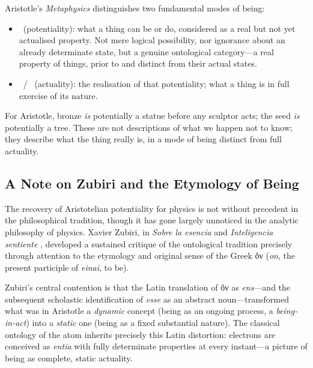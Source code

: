Aristotle's \textit{Metaphysics} \cite{aristotle_1924_metaphysics} distinguishes two fundamental modes of being:

\begin{itemize}
  \item \dunamis\ (potentiality): what a thing can be or do, considered as a real but not yet actualised property. Not mere logical possibility, nor ignorance about an already determinate state, but a genuine ontological category---a real property of things, prior to and distinct from their actual states.
  \item \energeia\ / \entelechia\ (actuality): the realisation of that potentiality; what a thing is in full exercise of its nature.
\end{itemize}

For Aristotle, bronze \textit{is} potentially a statue before any sculptor acts; the seed \textit{is} potentially a tree.  These are not descriptions of what we happen not to know; they describe what the thing really is, in a mode of being distinct from full actuality.

\subsection{A Note on Zubiri and the Etymology of Being}

The recovery of Aristotelian potentiality for physics is not without precedent in the philosophical tradition, though it has gone largely unnoticed in the analytic philosophy of physics. Xavier Zubiri, in \textit{Sobre la esencia} \cite{zubiri_1962_esencia} and \textit{Inteligencia sentiente} \cite{zubiri_1980_inteligencia}, developed a sustained critique of the ontological tradition precisely through attention to the etymology and original sense of the Greek \textgreek{ὄν} (\textit{on}, the present participle of \textit{einai}, to be).

\medskip

Zubiri's central contention is that the Latin translation of \textgreek{ὄν} as \textit{ens}---and the subsequent scholastic identification of \textit{esse} as an abstract noun---transformed what was in Aristotle a \textit{dynamic} concept (being as an ongoing process, a \textit{being-in-act}) into a \textit{static} one (being as a fixed substantial nature). The classical ontology of the atom inherits precisely this Latin distortion: electrons are conceived as \textit{entia} with fully determinate properties at every instant---a picture of being as complete, static actuality.


